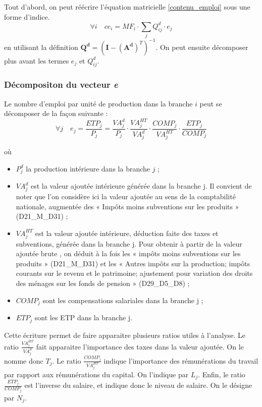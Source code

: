 Tout d'abord, on peut réécrire l'équation matricielle \ref{contenu_emploi} sous une forme d'indice. 
\begin{equation}
\forall i \quad ce_i = MF_i \cdot \sum_j Q^d_{ij} \cdot e_j
\label{decompo_initiale}
\end{equation}
en utilisant la définition $\pmb{Q^d} = (\pmb{I} - (\pmb{A^d})^T)^{-1}$. On peut ensuite décomposer plus avant les termes $e_j$ et $Q^d_{ij}$.

\subsubsection{Décompositon du vecteur \textit{\textbf{e}}}

Le nombre d'emploi par unité de production dans la branche $i$ peut se décomposer de la façon suivante :
\begin{equation}
\forall j \quad e_j = \frac{ETP_j}{P_j} = \frac{VA^d_j}{P_j} \cdot \frac{VA^{HT}_j}{VA^d_j} \cdot \frac{COMP_j}{VA^{HT}_j} \cdot \frac{ETP_j}{COMP_j}
\label{decompo_e}
\end{equation}

où 
\begin{itemize}
	\item $P^d_j$ la production intérieure dans la branche $j$ ;
	\item $VA^d_j$ est la valeur ajoutée intérieure générée dans la branche j. Il convient de noter que l’on considère ici la valeur ajoutée au sens de la comptabilité nationale, augmentée des « Impôts moins subventions sur les produits » (D21\_M\_D31) ;
	\item $VA^{HT}_j$ est la valeur ajoutée intérieure, déduction faite des taxes et subventions, générée dans la branche j. Pour obtenir  à partir de la valeur ajoutée brute , on déduit à la fois les « impôts moins subventions sur les produits » (D21\_M\_D31) et les « Autres impôts sur la production; impôts courants sur le revenu et le patrimoine; ajustement pour variation des droits des ménages sur les fonds de pension » (D29\_D5\_D8) ;
	\item $COMP_j$ sont les compensations salariales dans la branche j ;
	\item $ETP_j$ sont les ETP dans la branche j.
\end{itemize}
Cette écriture permet de faire apparaitre plusieurs ratios utiles à l'analyse. Le ratio $\frac{VA^{HT}_j}{VA^d_j}$ fait apparaitre l'importance des taxes dans la valeur ajoutée. On le nomme donc $T_j$. Le ratio $ \frac{COMP_j}{VA^{HT}_j}$ indique l'importance des rémunérations du travail par rapport aux rémunérations du capital. On l'indique par $L_j$. Enfin, le ratio $\frac{ETP_j}{COMP_j}$ est l'inverse du salaire, et indique donc le niveau de salaire. On le désigne par $N_j$.

